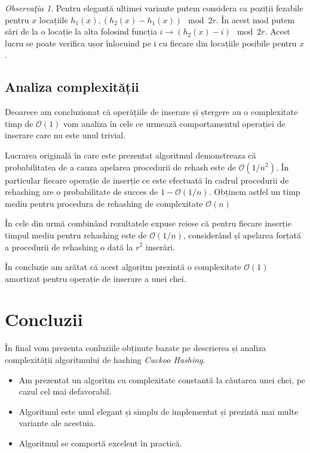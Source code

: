 \documentclass[a4paper]{article}
\theoremstyle{remark}
\newtheorem{remark}{Observa\c{t}ia}
\theoremstyle{definition}
\begin{document}
\begin{remark}
Pentru eleganță ultimei variante putem considera ca poziții fezabile pentru $x$ locațiile $h_1(x), (h_2(x) - h_1(x)) \mod 2r$. În acest mod putem sări de la o locație la alta folosind funcția $i \to (h_2(x) - i) \mod 2r$. Acest lucru se poate verifica ușor înlocuind pe i cu fiecare din locațiile posibile pentru $x$.
\end{remark}

\subsection{Analiza complexității}

Deoarece am concluzionat că operățiile de inserare și ștergere au o complexitate timp de $\mathcal{O}(1)$ vom analiza în cele ce urmează comportamentul operației de inserare care nu este unul trivial.

Lucrarea originală în care este prezentat algoritmul demonstreaza că probabilitatea de a cauza apelarea procedurii de rehash este de $\mathcal{O}(1/n^2)$. În particular fiecare operație de inserție ce este efectuată în cadrul procedurii de rehashing are o probabilitate de succes de $1 - \mathcal{O}(1/n)$. Obținem astfel un timp mediu pentru procedura de rehashing de complexitate $\mathcal{O}(n)$ 

În cele din urmă combinând rezultatele expuse reiese că pentru fiecare inserție timpul mediu pentru rehashing este de $\mathcal{O}(1/n)$, considerând șî apelarea forțată a procedurii de rehashing o dată la $r^2$ inserări.

În concluzie am arătat că acest algoritm prezintă o complexitate $\mathcal{O}(1)$ amortizat pentru operație de inserare a unei chei.

\section {Concluzii}

În final vom prezenta conluziile obținute bazate pe descrierea și analiza complexității algoritmului de hashing \textit{Cuckoo Hashing}.

\begin{itemize}

\item Am prezentat un algoritm cu complexitate constantă la căutarea unei chei, pe cazul cel mai defavorabil.

\item Algoritmul este unul elegant și simplu de implementat și prezintă mai multe variante ale acestuia.

\item Algoritmul se comportă excelent în practică.

\end{itemize}

\newpage

\nocite{*}

{}

\end{document}
